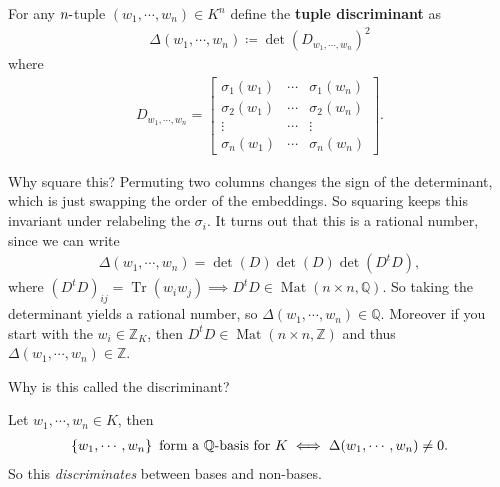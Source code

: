\begin{definition}

For any \(n{\hbox{-}}\)tuple \((w_1, \cdots, w_n) \in K^n\) define the
\textbf{tuple discriminant} as
\begin{align*}
\Delta(w_1, \cdots, w_n) \coloneqq\det( D_{w_1, \cdots, w_n} )^2 
\end{align*}
where
\begin{align*}
D_{w_1, \cdots, w_n}
=
\begin{bmatrix}
\sigma_1(w_1) & \cdots  & \sigma_1(w_n) \\
\sigma_2(w_1) & \cdots  & \sigma_2(w_n) \\
\vdots & \cdots & \vdots \\
\sigma_n(w_1) & \cdots  & \sigma_n(w_n) 
\end{bmatrix}
.\end{align*}

\end{definition}

\begin{remark}

Why square this? Permuting two columns changes the sign of the
determinant, which is just swapping the order of the embeddings. So
squaring keeps this invariant under relabeling the \(\sigma_i\). It
turns out that this is a rational number, since we can write
\begin{align*}
\Delta(w_1, \cdots, w_n) 
= \det(D) \det(D) 
\det(D^t D)
,\end{align*}
where
\((D^t D)_{ij} = \operatorname{Tr}(w_i w_j) \implies D^t D \in \operatorname{Mat}(n\times n, {\mathbb{Q}})\).
So taking the determinant yields a rational number, so
\(\Delta(w_1, \cdots, w_n) \in {\mathbb{Q}}\). Moreover if you start
with the \(w_i \in {\mathbb{Z}}_K\), then
\(D^t D \in \operatorname{Mat}(n\times n, {\mathbb{Z}})\) and thus
\(\Delta(w_1, \cdots, w_n) \in {\mathbb{Z}}\).

Why is this called the discriminant?

\end{remark}

\begin{theorem}[?]

Let \(w_1, \cdots, w_n\in K\), then
\begin{align*}
\left\{{ w_1, \cdots, w_n }\right\} \text{ form a ${\mathbb{Q}}{\hbox{-}}$basis for $K$}
\iff
\Delta(w_1, \cdots, w_n) \neq 0
.\end{align*}
So this \emph{discriminates} between bases and non-bases.

\end{theorem}

